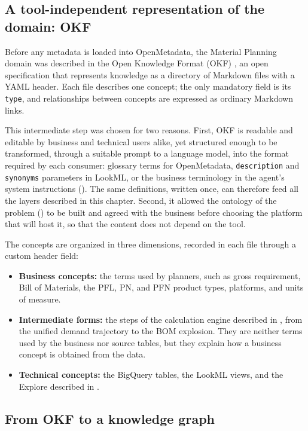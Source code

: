\subsection{A tool-independent representation of the domain: OKF}
\label{subsec:okf}

Before any metadata is loaded into OpenMetadata, the Material Planning domain was described in the Open Knowledge Format (OKF) \cite{googlecloudokf2026, okfspec2026}, an open specification that represents knowledge as a directory of Markdown files with a YAML header. Each file describes one concept; the only mandatory field is its \texttt{type}, and relationships between concepts are expressed as ordinary Markdown links.

This intermediate step was chosen for two reasons. First, OKF is readable and editable by business and technical users alike, yet structured enough to be transformed, through a suitable prompt to a language model, into the format required by each consumer: glossary terms for OpenMetadata, \texttt{description} and \texttt{synonyms} parameters in LookML, or the business terminology in the agent's system instructions (). The same definitions, written once, can therefore feed all the layers described in this chapter. Second, it allowed the ontology of the problem () to be built and agreed with the business before choosing the platform that will host it, so that the content does not depend on the tool.

The concepts are organized in three dimensions, recorded in each file through a custom header field:
\begin{itemize}
    \item \textbf{Business concepts:} the terms used by planners, such as gross requirement, Bill of Materials, the PFL, PN, and PFN product types, platforms, and units of measure.
    \item \textbf{Intermediate forms:} the steps of the calculation engine described in , from the unified demand trajectory to the BOM explosion. They are neither terms used by the business nor source tables, but they explain how a business concept is obtained from the data.
    \item \textbf{Technical concepts:} the BigQuery tables, the LookML views, and the Explore described in .
\end{itemize}

\subsection{From OKF to a knowledge graph}
\label{subsec:okf_kg}

